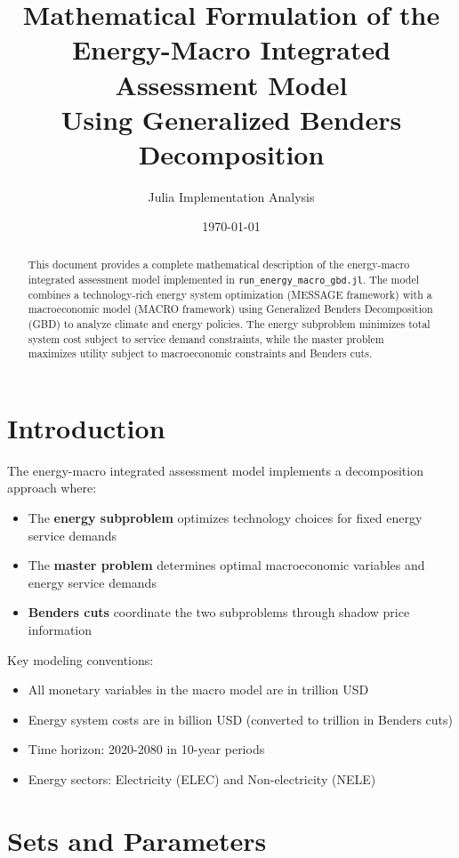 \documentclass[11pt]{article}
\title{Mathematical Formulation of the Energy-Macro Integrated Assessment Model\\
Using Generalized Benders Decomposition}
\author{Julia Implementation Analysis}
\date{\today}
\begin{document}
\maketitle

\begin{abstract}
This document provides a complete mathematical description of the energy-macro integrated assessment model implemented in \texttt{run\_energy\_macro\_gbd.jl}. The model combines a technology-rich energy system optimization (MESSAGE framework) with a macroeconomic model (MACRO framework) using Generalized Benders Decomposition (GBD) to analyze climate and energy policies. The energy subproblem minimizes total system cost subject to service demand constraints, while the master problem maximizes utility subject to macroeconomic constraints and Benders cuts.
\end{abstract}

\tableofcontents

\section{Introduction}

The energy-macro integrated assessment model implements a decomposition approach where:
\begin{itemize}
\item The \textbf{energy subproblem} optimizes technology choices for fixed energy service demands
\item The \textbf{master problem} determines optimal macroeconomic variables and energy service demands
\item \textbf{Benders cuts} coordinate the two subproblems through shadow price information
\end{itemize}

Key modeling conventions:
\begin{itemize}
\item All monetary variables in the macro model are in trillion USD
\item Energy system costs are in billion USD (converted to trillion in Benders cuts)
\item Time horizon: 2020-2080 in 10-year periods
\item Energy sectors: Electricity (ELEC) and Non-electricity (NELE)
\end{itemize}

\section{Sets and Parameters}
\end{document}
